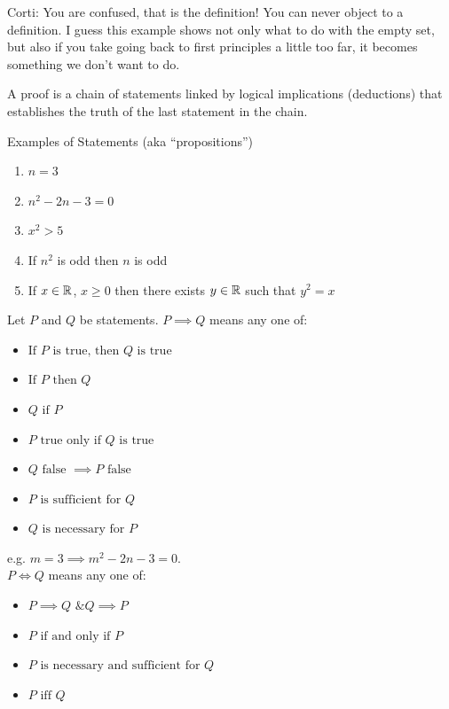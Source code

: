 \documentclass[10pt]{scrartcl}
\begin{document}
Corti: You are confused, that is the definition! You can never object to a definition. I guess this example shows not only what to do with the empty set, but also if you take going back to first principles a little too far, it becomes something we don't want to do. 


A proof is a chain of statements linked by logical implications (deductions) that establishes the truth of the last statement in the chain.\\

\begin{examples}
Examples of Statements (aka	``propositions'')
\begin{enumerate}
\item $n = 3$
\item $n^2 - 2n - 3 = 0$
\item $x^2 > 5$
\item If $n^2$ is odd then $n$ is odd
\item If $x \in\mathbb{R}$, $x\geq 0$ then there exists $y \in\mathbb{R}$ such that $y^2 = x$	
\end{enumerate}
\end{examples}\vsp



Let $P$ and $Q$ be statements. $P \implies Q$ means any one of: 
\begin{itemize}
\item $\text{If } P \text{ is true, then } Q \text{ is true}$
\item $\text{If } P \text{ then } Q$
\item $Q \text{ if } P$
\item $P \text{ true only if } Q \text{ is true}$
\item $Q \text{ false } \implies P \mbox{ false }$
\item $P \text{ is sufficient for } Q$
\item $Q \text{ is necessary for } P$\\
\end{itemize}

e.g. $m =3 \implies m^2 - 2n - 3 = 0$.\\

$P \iff Q$ means any one of: 
\begin{itemize}
\item  $P \implies Q \text{ \& } Q \implies P$
\item $ P \text{ if and only if } P$
\item $  P \text{ is necessary and sufficient for } Q$
\item $  P \text{ iff } Q$\\
\end{itemize}
\end{document}
